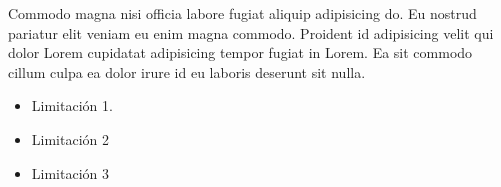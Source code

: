
Commodo magna nisi officia labore fugiat aliquip adipisicing do. Eu nostrud pariatur elit veniam eu enim magna commodo. Proident id adipisicing velit qui dolor Lorem cupidatat adipisicing tempor fugiat in Lorem. Ea sit commodo cillum culpa ea dolor irure id eu laboris deserunt sit nulla.

\begin{itemize}
  \item Limitación 1.
  \item Limitación 2
  \item Limitación 3
\end{itemize}
